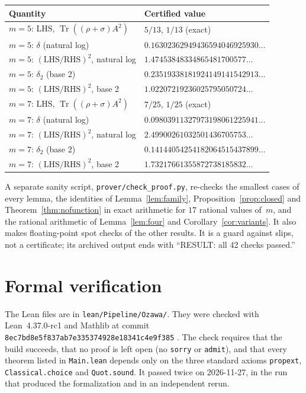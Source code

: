 \documentclass[11pt]{amsart}
\theoremstyle{definition}\newtheorem{definition}[theorem]{Definition}
\theoremstyle{remark}\newtheorem{remark}[theorem]{Remark}
\DeclareMathOperator{\Tr}{Tr}
\newcommand{\LHS}{\mathrm{LHS}}
\newcommand{\RHS}{\mathrm{RHS}}
\begin{document}
\begin{center}
\small
\begin{tabular}{ll}
\toprule
Quantity & Certified value \\
\midrule
\(m=5\): \(\LHS\), \(\Tr((\rho+\sigma)A^2)\) & \(5/13\), \(1/13\) (exact) \\
\(m=5\): \(\delta\) (natural log) & \(0.16302362949436594046925930\dots\) \\
\(m=5\): \((\LHS/\RHS)^2\), natural log & \(1.47453848334865481700577\dots\) \\
\(m=5\): \(\delta_2\) (base 2) & \(0.23519338181924149141542913\dots\) \\
\(m=5\): \((\LHS/\RHS)^2\), base 2 & \(1.02207219236025795050724\dots\) \\
\midrule
\(m=7\): \(\LHS\), \(\Tr((\rho+\sigma)A^2)\) & \(7/25\), \(1/25\) (exact) \\
\(m=7\): \(\delta\) (natural log) & \(0.09803911327973198061225941\dots\) \\
\(m=7\): \((\LHS/\RHS)^2\), natural log & \(2.49900261032501436705753\dots\) \\
\(m=7\): \(\delta_2\) (base 2) & \(0.14144054254182064515437899\dots\) \\
\(m=7\): \((\LHS/\RHS)^2\), base 2 & \(1.73217661355872738185832\dots\) \\
\bottomrule
\end{tabular}
\end{center}

A separate sanity script, \texttt{prover/check\_proof.py}, re-checks the smallest cases of every lemma, the identities of Lemma~\ref{lem:family}, Proposition~\ref{prop:closed} and Theorem~\ref{thm:nofunction} in exact arithmetic for \(17\) rational values of~\(m\), and the rational arithmetic of Lemma~\ref{lem:four} and Corollary~\ref{cor:variants}. It also makes floating-point spot checks of the other results. It is a guard against slips, not a certificate; its archived output ends with ``RESULT: all 42 checks passed.''

\section{Formal verification}\label{sec:lean}

The Lean files are in \texttt{lean/Pipeline/Ozawa/}. They were checked with Lean~4.37.0-rc1 \cite{lean4} and Mathlib at commit \texttt{8ec7bd8e5f837ab7e335374928e18341c4e9f385} \cite{mathlib}. The check requires that the build succeeds, that no proof is left open (no \texttt{sorry} or \texttt{admit}), and that every theorem listed in \texttt{Main.lean} depends only on the three standard axioms \texttt{propext}, \texttt{Classical.choice} and \texttt{Quot.sound}. It passed twice on 2026-11-27, in the run that produced the formalization and in an independent rerun.
\end{document}
